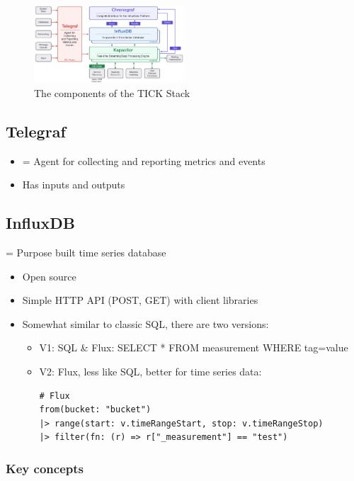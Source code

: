 \documentclass{article}
\begin{document}
\begin{figure}[H]
    \centering
    \includegraphics[width=0.5\textwidth]{tick-stack-components.png}
    \caption{The components of the TICK Stack}
\end{figure}

\subsection{Telegraf}

\begin{itemize}
    \item = Agent for collecting and reporting metrics and events
    \item Has inputs and outputs
\end{itemize}

\subsection{InfluxDB}

= Purpose built time series database

\begin{itemize}
    \item Open source
    \item Simple HTTP API (POST, GET) with client libraries
    \item Somewhat similar to classic SQL, there are two versions:
    \begin{itemize}
        \item V1: SQL \& Flux: SELECT * FROM measurement WHERE tag=value
        \item V2: Flux, less like SQL, better for time series data:
\begin{verbatim}
# Flux
from(bucket: "bucket")
|> range(start: v.timeRangeStart, stop: v.timeRangeStop)
|> filter(fn: (r) => r["_measurement"] == "test")
\end{verbatim}
    \end{itemize}
\end{itemize}

\subsubsection{Key concepts}
\end{document}
